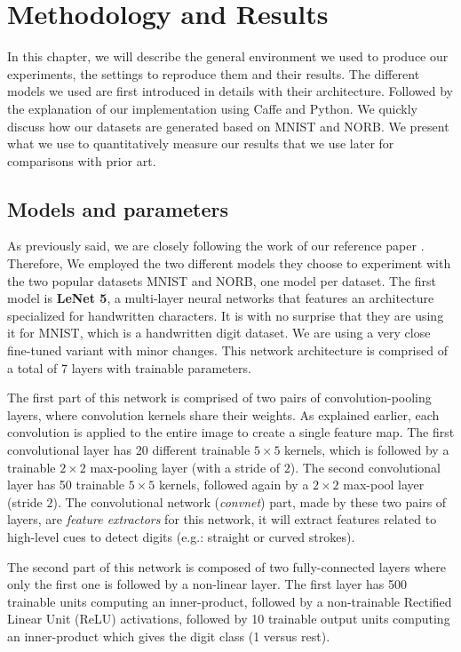 \documentclass[a4paper,12pt]{report}
\newcommand{\eg}{e.g.}
\begin{document}
\chapter{Methodology and Results}

In this chapter, we will describe the general environment we used to produce our experiments, the settings to reproduce them and their results.
The different models we used are first introduced in details with their architecture.
Followed by the explanation of our implementation using Caffe and Python.
We quickly discuss how our datasets are generated based on MNIST and NORB.
We present what we use to quantitatively measure our results that we use later for comparisons with prior art.

\section{Models and parameters}

As previously said, we are closely following the work of our reference paper \cite{hadsell2006dimensionality}.
Therefore, We employed the two different models they choose to experiment with the two popular datasets MNIST and NORB, one model per dataset.
The first model is {\bf LeNet 5}, a multi-layer neural networks that features an architecture specialized for handwritten characters.
It is with no surprise that they are using it for MNIST, which is a handwritten digit dataset.
We are using a very close fine-tuned variant with minor changes.
This network architecture is comprised of a total of 7 layers with trainable parameters.

The first part of this network is comprised of two pairs of convolution-pooling layers, where convolution kernels share their weights.
As explained earlier, each convolution is applied to the entire image to create a single feature map.
The first convolutional layer has 20 different trainable $5 \times 5$ kernels, which is followed by a trainable $2 \times 2$ max-pooling layer (with a stride of $2$).
The second convolutional layer has 50 trainable $5 \times 5$ kernels, followed again by a $2 \times 2$ max-pool layer (stride $2$).
The convolutional network ({\em convnet}) part, made by these two pairs of layers, are {\em feature extractors} for this network, it will extract features related to high-level cues to detect digits (\eg: straight or curved strokes).

The second part of this network is composed of two fully-connected layers where only the first one is followed by a non-linear layer.
The first layer has 500 trainable units computing an inner-product, followed by a non-trainable Rectified Linear Unit (ReLU) activations\cite{nair2010rectified}, followed by 10 trainable output units computing an inner-product which gives the digit class (1 versus rest).
\end{document}
